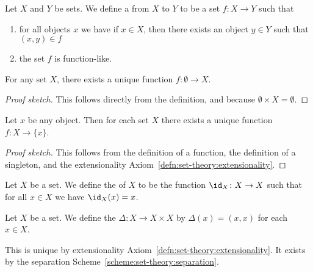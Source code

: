 \begin{definition}
Let $X$ and $Y$ be sets. We define a  from $X$ to $Y$
to be a set $f\colon X\to Y$ such that
\begin{enumerate}
\item for all objects $x$ we have if $x\in X$, then there exists an
  object $y\in Y$ such that $(x,y)\in f$
\item the set $f$ is function-like.
\end{enumerate}
\end{definition}

\begin{theorem}
For any set $X$, there exists a unique function $f\colon\emptyset\to X$.
\end{theorem}

\begin{proof}[Proof sketch]
This follows directly from the definition, and because
$\emptyset\times X=\emptyset$.
\end{proof}

\begin{theorem}
Let $x$ be any object. Then for each set $X$ there exists a unique
function $f\colon X\to\{x\}$.
\end{theorem}

\begin{proof}[Proof sketch]
This follows from the definition of a function, the definition of a
singleton, and the extensionality Axiom~\ref{defn:set-theory:extensionality}.
\end{proof}

\begin{definition}
Let $X$ be a set. We define the  of $X$ to
be the function $\id_{X}\colon X\to X$ such that for all $x\in X$ we
have $\id_{X}(x)=x$.
\end{definition}

\begin{definition}\label{defn:set-theory:diagonal-function}
Let $X$ be a set. We define the 
$\Delta\colon X\to X\times X$ by $\Delta(x)=(x,x)$ for each $x\in X$.

This is unique by extensionality Axiom~\ref{defn:set-theory:extensionality}. It exists by the separation Scheme~\ref{scheme:set-theory:separation}.
\end{definition}


